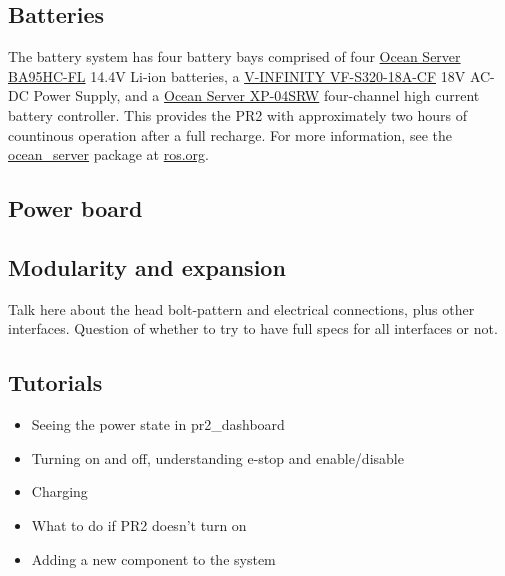 \subsection{Batteries}
The battery system has four battery bays comprised of four \href{http://www.oceanserver-store.com/18.html}{Ocean Server BA95HC-FL}
14.4V Li-ion batteries, a \href{http://www.v-infinity.com/adtemplate_child.asp?c=710918&p=903285&catky=764537&subcatky1=46887&subcatky2=320934}{V-INFINITY VF-S320-18A-CF}
18V AC-DC Power Supply, and a \href{http://www.oceanserver-store.com/xpmibamamo.html}{Ocean Server XP-04SRW} four-channel high current battery controller. 
This provides the PR2 with approximately two hours of countinous operation after a full recharge. For more information, see the 
\href{http://www.ros.org/wiki/ocean\_server}{ocean\_server} package at \href{http://www.ros.org}{ros.org}.

\subsection{Power board}

\subsection{Modularity and expansion}
Talk here about the head bolt-pattern and electrical connections, plus other interfaces.  Question of whether to try to have full specs for all interfaces or not.
\subsection{Tutorials} 
\begin{itemize}
\item{Seeing the power state in pr2\_dashboard}
\item{Turning on and off, understanding e-stop and enable/disable}
\item{Charging}
\item{What to do if PR2 doesn't turn on}
\item{Adding a new component to the system}
\end{itemize}


